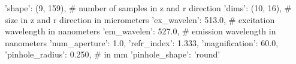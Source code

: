 {'shape': (9, 159),  # number of samples in z and r direction
'dims': (10, 16),   # size in z and r direction in micrometers
'ex_wavelen': 513.0,  # excitation wavelength in nanometers
'em_wavelen': 527.0,  # emission wavelength in nanometers
'num_aperture': 1.0,
'refr_index': 1.333,
'magnification': 60.0,
'pinhole_radius': 0.250,  # in mm
'pinhole_shape': 'round'}